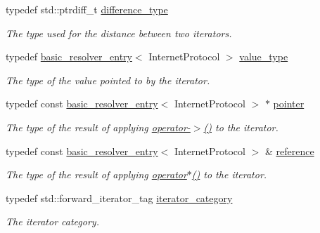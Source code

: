 \begin{DoxyCompactItemize}
\item 
typedef std\+::ptrdiff\+\_\+t \hyperlink{classasio_1_1ip_1_1basic__resolver__iterator_a6c0d555e8e97958833c023e6545a150c}{difference\+\_\+type}
\begin{DoxyCompactList}\small\item\em The type used for the distance between two iterators. \end{DoxyCompactList}\item 
typedef \hyperlink{classasio_1_1ip_1_1basic__resolver__entry}{basic\+\_\+resolver\+\_\+entry}$<$ Internet\+Protocol $>$ \hyperlink{classasio_1_1ip_1_1basic__resolver__iterator_a85b228cf337eb8bd82417e8e0fa04bc3}{value\+\_\+type}
\begin{DoxyCompactList}\small\item\em The type of the value pointed to by the iterator. \end{DoxyCompactList}\item 
typedef const \hyperlink{classasio_1_1ip_1_1basic__resolver__entry}{basic\+\_\+resolver\+\_\+entry}$<$ Internet\+Protocol $>$ $\ast$ \hyperlink{classasio_1_1ip_1_1basic__resolver__iterator_a6bb629a7663540e1ceeb55a96dfc4d86}{pointer}
\begin{DoxyCompactList}\small\item\em The type of the result of applying \hyperlink{classasio_1_1ip_1_1basic__resolver__iterator_a378f8ec7cc93a80e69d83cd202d76935}{operator-\/$>$()} to the iterator. \end{DoxyCompactList}\item 
typedef const \hyperlink{classasio_1_1ip_1_1basic__resolver__entry}{basic\+\_\+resolver\+\_\+entry}$<$ Internet\+Protocol $>$ \& \hyperlink{classasio_1_1ip_1_1basic__resolver__iterator_ac0c7c52cd6c6cc46ebf02a29c1a61c66}{reference}
\begin{DoxyCompactList}\small\item\em The type of the result of applying \hyperlink{classasio_1_1ip_1_1basic__resolver__iterator_a5066e44d7e003dd08cc7b6c7caa8fb4f}{operator$\ast$()} to the iterator. \end{DoxyCompactList}\item 
typedef std\+::forward\+\_\+iterator\+\_\+tag \hyperlink{classasio_1_1ip_1_1basic__resolver__iterator_afd328785b7b40036161e46d59a8a126d}{iterator\+\_\+category}
\begin{DoxyCompactList}\small\item\em The iterator category. \end{DoxyCompactList}\end{DoxyCompactItemize}
